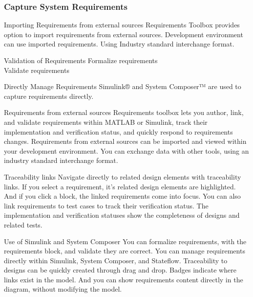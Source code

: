 \begin{frame}
\frametitle{Capture System Requirements }

\begin{block}{Importing Requirements from external sources }
Requirements Toolbox provides option to import requirements from external sources.  Development environment can use imported requirements.   Using Industry standard interchange format.
\end{block}

\begin{block}{Validation of Requirements}
Formalize requirements \\
Validate requirements 
\end{block}

\begin{block}{Directly Manage Requirements}
Simulink®  and 
System Composer™  are used to capture requirements directly.
\end{block}
\end{frame}


\begin{frame}
\begin{block}{Requirements from external sources}
Requirements toolbox lets you author, link, and validate requirements within MATLAB or Simulink, track their implementation and verification status, and quickly respond to requirements changes. Requirements from external sources can be imported and viewed within your development environment. You can exchange data with other tools, using an industry standard interchange format.
\end{block}
\end{frame}

\begin{frame}
\begin{block}{Traceability links}
Navigate directly to related design elements with traceability links. If you select a requirement, it's related design elements are highlighted. And if you click a block, the linked requirements come into focus. You can also link requirements to test cases to track their verification status. The implementation and verification statuses show the completeness of designs and related tests.
\end{block}
\end{frame}


\begin{frame}
\begin{block}{ Use of Simulink and System Composer}
You can formalize requirements, with the requirements block, and validate they are correct. You can manage requirements directly within Simulink, System Composer, and Stateflow. Traceability to designs can be quickly created through drag and drop. Badges indicate where links exist in the model. And you can show requirements content directly in the diagram, without modifying the model.
\end{block}
\end{frame}


